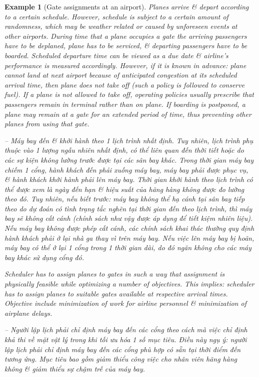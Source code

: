 \documentclass{article}
\newtheorem{example}{Example}
\begin{document}
\begin{itemize}
\begin{itemize}
\begin{example}[Gate assignments at an airport]
            Planes arrive \& depart according to a certain schedule. However, schedule is subject to a certain amount of randomness, which may be weather related or caused by unforeseen events at other airports. During time that a plane occupies a gate the arriving passengers have to be deplaned, plane has to be serviced, \& departing passengers have to be boarded. Scheduled departure time can be viewed as a due date \& airline's performance is measured accordingly. However, if it is known in advance: plane cannot land at next airport because of anticipated congestion at its scheduled arrival time, then plane does not take off (such a policy is followed to conserve fuel). If a plane is not allowed to take off, operating policies usually prescribe that passengers remain in terminal rather than on plane. If boarding is postponed, a plane may remain at a gate for an extended period of time, thus preventing other planes from using that gate.
            
            -- Máy bay đến \& khởi hành theo 1 lịch trình nhất định. Tuy nhiên, lịch trình phụ thuộc vào 1 lượng ngẫu nhiên nhất định, có thể liên quan đến thời tiết hoặc do các sự kiện không lường trước được tại các sân bay khác. Trong thời gian máy bay chiếm 1 cổng, hành khách đến phải xuống máy bay, máy bay phải được phục vụ, \& hành khách khởi hành phải lên máy bay. Thời gian khởi hành theo lịch trình có thể được xem là ngày đến hạn \& hiệu suất của hãng hàng không được đo lường theo đó. Tuy nhiên, nếu biết trước: máy bay không thể hạ cánh tại sân bay tiếp theo do dự đoán có tình trạng tắc nghẽn tại thời gian đến theo lịch trình, thì máy bay sẽ không cất cánh (chính sách như vậy được áp dụng để tiết kiệm nhiên liệu). Nếu máy bay không được phép cất cánh, các chính sách khai thác thường quy định hành khách phải ở lại nhà ga thay vì trên máy bay. Nếu việc lên máy bay bị hoãn, máy bay có thể ở lại 1 cổng trong 1 thời gian dài, do đó ngăn không cho các máy bay khác sử dụng cổng đó.
                        
            Scheduler has to assign planes to gates in such a way that assignment is physically feasible while optimizing a number of objectives. This implies: scheduler has to assign planes to suitable gates available at respective arrival times. Objective include minimization of work for airline personnel \& minimization of airplane delays.
            
            -- Người lập lịch phải chỉ định máy bay đến các cổng theo cách mà việc chỉ định khả thi về mặt vật lý trong khi tối ưu hóa 1 số mục tiêu. Điều này ngụ ý: người lập lịch phải chỉ định máy bay đến các cổng phù hợp có sẵn tại thời điểm đến tương ứng. Mục tiêu bao gồm giảm thiểu công việc cho nhân viên hãng hàng không \& giảm thiểu sự chậm trễ của máy bay.
            

\end{example}
\end{itemize}
\end{itemize}
\end{document}
